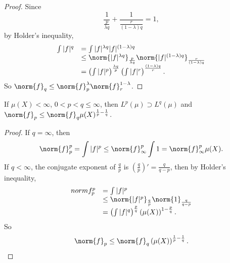 \begin{proof}
    Since 
    \begin{displaymath}
        \frac{1}{\frac{p}{\lambda q}}
        +\frac{1}{\frac{r}{(1-\lambda)q}}=1,
    \end{displaymath}
    by Holder's inequality, 
    \begin{displaymath}
        \begin{array}{rl}
            \int |f|^{q}&=\int|f|^{\lambda q}|f|^{(1-\lambda)q}\\
            &\le\norm{|f|^{\lambda q}}_{\frac{p}{\lambda q}}
            \norm{|f|^{(1-\lambda)q}}_{\frac{r}{(1-\lambda)q}}\\
            &=\left(\int|f|^{p}\right)^{\frac{\lambda q}{p}}
            \left(\int|f|^{r}\right)^{\frac{(1-\lambda)q}{r}}.
        \end{array}
    \end{displaymath}
    So $\norm{f}_{q}\le\norm{f}_{p}^{\lambda}\norm{f}_{r}^{1-\lambda}$.
\end{proof}
\begin{prop}
    \label{Prop:LpContainLq}
    If $\mu(X)<\infty$, $0<p<q\le\infty$, then 
    $L^{p}(\mu)\supset L^{q}(\mu)$ and 
    $\norm{f}_{p}\le\norm{f}_{q}\mu(X)^{\frac{1}{p}-\frac{1}{q}}$.
\end{prop}
\begin{proof}
    If $q=\infty$, then 
    \begin{displaymath}
        \norm{f}_{p}^{p}=\int|f|^{p}\le\norm{f}_{\infty}^{p}\int 1
        =\norm{f}_{\infty}^{p}\mu(X).
    \end{displaymath}
    If $q<\infty$, the conjugate exponent of $\frac{q}{p}$ is 
    $\left(\frac{q}{p}\right)'=\frac{q}{q-p}$, then by Holder's 
    inequality, 
    \begin{displaymath}
        \begin{array}{rl}
            norm{f}_{p}^{p}&=\int|f|^{p}\\
            &\le\norm{|f|^{p}}_{\frac{q}{p}}\norm{1}_{\frac{q}{q-p}}\\
            &=\left(\int|f|^{q}\right)^{\frac{p}{q}}
            \left(\mu(X)\right)^{1-\frac{p}{q}}.\\
        \end{array}
    \end{displaymath}
    So 
    \begin{displaymath}
        \norm{f}_{p}\le\norm{f}_{q}
        \left(\mu(X)\right)^{\frac{1}{p}-\frac{1}{q}}.
    \end{displaymath}
\end{proof}
